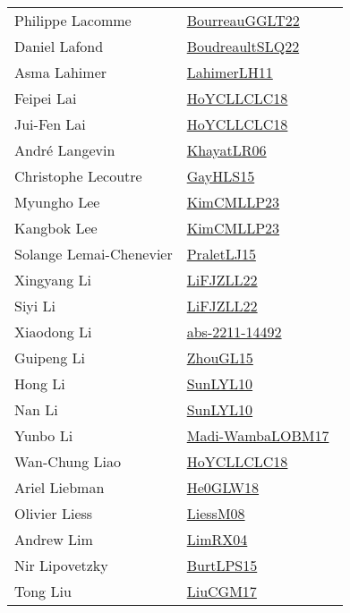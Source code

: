{\begin{longtable}{p{4cm}p{20cm}}
Philippe Lacomme & \href{works/BourreauGGLT22.pdf}{BourreauGGLT22}~\cite{BourreauGGLT22}\\
Daniel Lafond & \href{works/BoudreaultSLQ22.pdf}{BoudreaultSLQ22}~\cite{BoudreaultSLQ22}\\
Asma Lahimer & \href{works/LahimerLH11.pdf}{LahimerLH11}~\cite{LahimerLH11}\\
Feipei Lai & \href{works/HoYCLLCLC18.pdf}{HoYCLLCLC18}~\cite{HoYCLLCLC18}\\
Jui{-}Fen Lai & \href{works/HoYCLLCLC18.pdf}{HoYCLLCLC18}~\cite{HoYCLLCLC18}\\
Andr{\'{e}} Langevin & \href{works/KhayatLR06.pdf}{KhayatLR06}~\cite{KhayatLR06}\\
Christophe Lecoutre & \href{works/GayHLS15.pdf}{GayHLS15}~\cite{GayHLS15}\\
Myungho Lee & \href{works/KimCMLLP23.pdf}{KimCMLLP23}~\cite{KimCMLLP23}\\
Kangbok Lee & \href{works/KimCMLLP23.pdf}{KimCMLLP23}~\cite{KimCMLLP23}\\
Solange Lemai{-}Chenevier & \href{works/PraletLJ15.pdf}{PraletLJ15}~\cite{PraletLJ15}\\
Xingyang Li & \href{works/LiFJZLL22.pdf}{LiFJZLL22}~\cite{LiFJZLL22}\\
Siyi Li & \href{works/LiFJZLL22.pdf}{LiFJZLL22}~\cite{LiFJZLL22}\\
Xiaodong Li & \href{works/abs-2211-14492.pdf}{abs-2211-14492}~\cite{abs-2211-14492}\\
Guipeng Li & \href{works/ZhouGL15.pdf}{ZhouGL15}~\cite{ZhouGL15}\\
Hong Li & \href{works/SunLYL10.pdf}{SunLYL10}~\cite{SunLYL10}\\
Nan Li & \href{works/SunLYL10.pdf}{SunLYL10}~\cite{SunLYL10}\\
Yunbo Li & \href{works/Madi-WambaLOBM17.pdf}{Madi-WambaLOBM17}~\cite{Madi-WambaLOBM17}\\
Wan{-}Chung Liao & \href{works/HoYCLLCLC18.pdf}{HoYCLLCLC18}~\cite{HoYCLLCLC18}\\
Ariel Liebman & \href{works/He0GLW18.pdf}{He0GLW18}~\cite{He0GLW18}\\
Olivier Liess & \href{works/LiessM08.pdf}{LiessM08}~\cite{LiessM08}\\
Andrew Lim & \href{works/LimRX04.pdf}{LimRX04}~\cite{LimRX04}\\
Nir Lipovetzky & \href{works/BurtLPS15.pdf}{BurtLPS15}~\cite{BurtLPS15}\\
Tong Liu & \href{works/LiuCGM17.pdf}{LiuCGM17}~\cite{LiuCGM17}\\

\end{longtable}}
